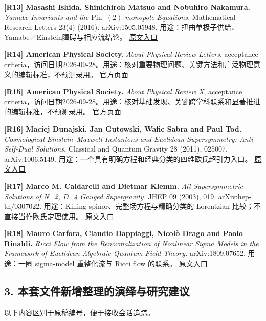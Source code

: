 \documentclass[UTF8,a4paper,11pt,fontset=fandol]{ctexart}
\begin{document}
\textbf{{[}R13{]} Masashi Ishida, Shinichiroh Matsuo and Nobuhiro
Nakamura.} \emph{Yamabe Invariants and the
\(\mathrm{Pin}^-(2)\)-monopole Equations.} Mathematical Research Letters
23(4) (2016). arXiv:1505.05948.
用途：扭曲单极子供给、Yamabe／Einstein障碍与相应流结论。
\href{https://arxiv.org/abs/1505.05948}{原文入口}

\textbf{{[}R14{]} American Physical Society.} \emph{About Physical
Review Letters}, acceptance
criteria，访问日期2026-09-28。用途：核对重要物理问题、关键方法和广泛物理意义的编辑标准，不预测录用。
\href{https://journals.aps.org/prl/about}{官方页面}

\textbf{{[}R15{]} American Physical Society.} \emph{About Physical
Review X}, acceptance
criteria，访问日期2026-09-28。用途：核对基础发现、关键跨学科联系和显著推进的编辑标准，不预测录用。
\href{https://journals.aps.org/prx/about}{官方页面}

\textbf{{[}R16{]} Maciej Dunajski, Jan Gutowski, Wafic Sabra and Paul
Tod.} \emph{Cosmological Einstein--Maxwell Instantons and Euclidean
Supersymmetry: Anti-Self-Dual Solutions.} Classical and Quantum Gravity
28 (2011), 025007. arXiv:1006.5149.
用途：一个具有明确方程和经典分类的四维欧氏超引力入口。
\href{https://arxiv.org/abs/1006.5149}{原文入口}

\textbf{{[}R17{]} Marco M. Caldarelli and Dietmar Klemm.} \emph{All
Supersymmetric Solutions of N=2, D=4 Gauged Supergravity.} JHEP 09
(2003), 019. arXiv:hep-th/0307022. 用途：Killing
spinor、完整场方程与精确分类的 Lorentzian 比较；不直接当作欧氏定理使用。
\href{https://arxiv.org/abs/hep-th/0307022}{原文入口}

\textbf{{[}R18{]} Mauro Carfora, Claudio Dappiaggi, Nicolò Drago and
Paolo Rinaldi.} \emph{Ricci Flow from the Renormalization of Nonlinear
Sigma Models in the Framework of Euclidean Algebraic Quantum Field
Theory.} arXiv:1809.07652. 用途：一圈 sigma-model 重整化流与 Ricci flow
的联系。 \href{https://arxiv.org/abs/1809.07652}{原文入口}

\subsection{3.
本套文件新增整理的演绎与研究建议}\label{ux672cux5957ux6587ux4ef6ux65b0ux589eux6574ux7406ux7684ux6f14ux7eceux4e0eux7814ux7a76ux5efaux8bae}

以下内容区别于原稿编号，便于接收会话追踪。
\end{document}
